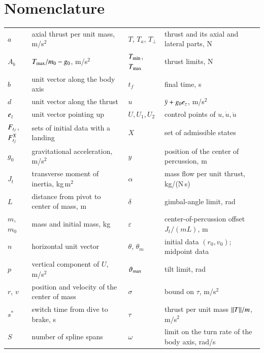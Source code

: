 \section{Nomenclature}
{\renewcommand{\arraystretch}{1.0}\noindent
\begin{tabular}{@{}l@{\ \,=\ \,}l@{\hspace{0.2in}}l@{\ \,=\ \,}l@{}}
$a$ & axial thrust per unit mass, m/s$^2$ & $T$, $T_a$, $T_\perp$ & thrust and its axial and lateral parts, N \\
$A_b$ & $T_{\max}/m_0-g_0$, m/s$^2$ & $T_{\min}$, $T_{\max}$ & thrust limits, N \\
$b$ & unit vector along the body axis & $t_f$ & final time, s \\
$d$ & unit vector along the thrust & $u$ & $\ddot y+g_0e_z$, m/s$^2$ \\
$e_z$ & unit vector pointing up & $U,U_1,U_2$ & control points of $u,\dot u,\ddot u$ \\
$F_{t_f}$, $F^{X}_{t_f}$ & sets of initial data with a landing & $X$ & set of admissible states \\
$g_0$ & gravitational acceleration, m/s$^2$ & $y$ & position of the center of percussion, m \\
$J_t$ & transverse moment of inertia, kg\,m$^2$ & $\alpha$ & mass flow per unit thrust, kg/(N\,s) \\
$L$ & distance from pivot to center of mass, m & $\delta$ & gimbal-angle limit, rad \\
$m$, $m_0$ & mass and initial mass, kg & $\varepsilon$ & center-of-percussion offset $J_t/(mL)$, m \\
$n$ & horizontal unit vector & $\theta$, $\theta_m$ & initial data $(r_0,v_0)$; midpoint data \\
$p$ & vertical component of $U$, m/s$^2$ & $\vartheta_{\max}$ & tilt limit, rad \\
$r$, $v$ & position and velocity of the center of mass & $\sigma$ & bound on $\tau$, m/s$^2$ \\
$s^*$ & switch time from dive to brake, s & $\tau$ & thrust per unit mass $\lVert T\rVert/m$, m/s$^2$ \\
$S$ & number of spline spans & $\omega$ & limit on the turn rate of the body axis, rad/s \\
\end{tabular}}

